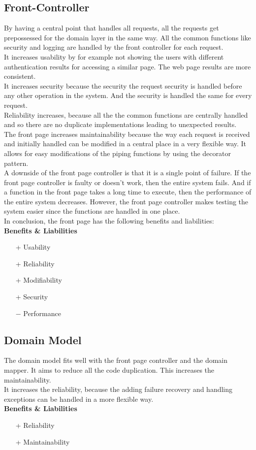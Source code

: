\subsection*{Front-Controller}
By having a central point that handles all requests, all the requests get prepossessed for the domain layer in the same way. All the common functions like security and logging are handled by the front controller for each request.\\
It increases usability by for example not showing the users with different authentication results for accessing a similar page. The web page results are more consistent.\\
It increases security because the security the request security is handled before any other operation in the system. And the security is handled the same for every request.\\
Reliability increases, because all the the common functions are centrally handled and so there are no duplicate implementations leading to unexpected results. \\
The front page increases maintainability because the way each request is received and initially handled can be modified in a central place in a very flexible way. It allows for easy modifications of the piping functions by using the decorator pattern.\\
A downside of the front page controller is that it is a single point of failure. If the front page controller is faulty or doesn't work, then the entire system fails. And if a function in the front page takes a long time to execute, then the performance of the entire system decreases. However, the front page controller makes testing the system easier since the functions are handled in one place.\\

In conclusion, the front page has the following benefits and liabilities:\\
\textbf{Benefits \& Liabilities} ~
\begin{itemize}
\item[+] Usability
\item[+] Reliability
\item[+] Modifiability
\item[+] Security
\item[$-$] Performance
\end{itemize}

\subsection*{Domain Model}
The domain model fits well with the front page controller and the domain mapper. It aims to reduce all the code duplication. This increases the maintainability.\\
It increases the reliability, because the adding failure recovery and handling exceptions can be handled in a more flexible way.\\
\textbf{Benefits \& Liabilities} ~
\begin{itemize}
\item[+] Reliability
\item[+] Maintainability
\end{itemize}

